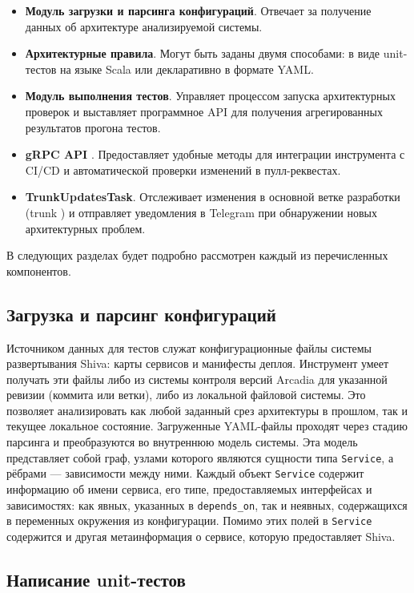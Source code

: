 \begin{itemize}
    \item \textbf{Модуль загрузки и парсинга конфигураций}. Отвечает за получение данных об архитектуре анализируемой системы.
    \item \textbf{Архитектурные правила}. Могут быть заданы двумя способами: в виде unit-тестов на языке Scala или декларативно в формате YAML.
    \item \textbf{Модуль выполнения тестов}. Управляет процессом запуска архитектурных проверок и выставляет программное API для получения агрегированных результатов прогона тестов.
    \item \textbf{gRPC API} \cite{grpc-fw}. Предоставляет удобные методы для интеграции инструмента с CI/CD и автоматической проверки изменений в пулл-реквестах.
    \item \textbf{TrunkUpdatesTask}. Отслеживает изменения в основной ветке разработки (trunk \cite{trunk-based-dev}) и отправляет уведомления в Telegram при обнаружении новых архитектурных проблем.
\end{itemize}

В следующих разделах будет подробно рассмотрен каждый из перечисленных компонентов.

\subsection{Загрузка и парсинг конфигураций}

Источником данных для тестов служат конфигурационные файлы системы развертывания Shiva: карты сервисов и манифесты деплоя. Инструмент умеет получать эти файлы либо из системы контроля версий Arcadia \cite{arcadia} для указанной ревизии (коммита или ветки), либо из локальной файловой системы. Это позволяет анализировать как любой заданный срез архитектуры в прошлом, так и текущее локальное состояние. Загруженные YAML-файлы проходят через стадию парсинга и преобразуются во внутреннюю модель системы. Эта модель представляет собой граф, узлами которого являются сущности типа \verb|Service|, а рёбрами — зависимости между ними. Каждый объект \verb|Service| содержит информацию об имени сервиса, его типе, предоставляемых интерфейсах и зависимостях: как явных, указанных в \verb|depends_on|, так и неявных, содержащихся в переменных окружения из конфигурации. Помимо этих полей в \verb|Service| содержится и другая метаинформация о сервисе, которую предоставляет Shiva.

\subsection{Написание unit-тестов}\label{unit-tests-design}

